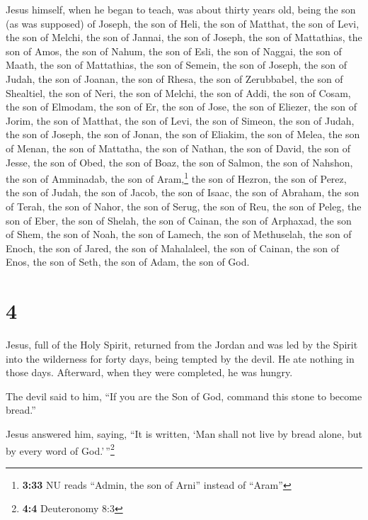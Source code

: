  Jesus himself, when he began to teach, was about thirty
years old, being the son (as was supposed) of Joseph, the son of Heli,
 the son of Matthat, the son of Levi, the son of Melchi,
the son of Jannai, the son of Joseph,  the son of
Mattathias, the son of Amos, the son of Nahum, the son of Esli, the son
of Naggai,  the son of Maath, the son of Mattathias, the
son of Semein, the son of Joseph, the son of Judah,  the
son of Joanan, the son of Rhesa, the son of Zerubbabel, the son of
Shealtiel, the son of Neri,  the son of Melchi, the son
of Addi, the son of Cosam, the son of Elmodam, the son of Er,
 the son of Jose, the son of Eliezer, the son of Jorim,
the son of Matthat, the son of Levi,  the son of Simeon,
the son of Judah, the son of Joseph, the son of Jonan, the son of
Eliakim,  the son of Melea, the son of Menan, the son of
Mattatha, the son of Nathan, the son of David,  the son
of Jesse, the son of Obed, the son of Boaz, the son of Salmon, the son
of Nahshon,  the son of Amminadab, the son of
Aram,\footnote{\textbf{3:33} NU reads ``Admin, the son of Arni'' instead
  of ``Aram''} the son of Hezron, the son of Perez, the son of Judah,
 the son of Jacob, the son of Isaac, the son of Abraham,
the son of Terah, the son of Nahor,  the son of Serug,
the son of Reu, the son of Peleg, the son of Eber, the son of Shelah,
 the son of Cainan, the son of Arphaxad, the son of Shem,
the son of Noah, the son of Lamech,  the son of
Methuselah, the son of Enoch, the son of Jared, the son of Mahalaleel,
the son of Cainan,  the son of Enos, the son of Seth, the
son of Adam, the son of God.

\hypertarget{section-3}{%
\section{4}\label{section-3}}

 Jesus, full of the Holy Spirit, returned from the Jordan
and was led by the Spirit into the wilderness  for forty
days, being tempted by the devil. He ate nothing in those days.
Afterward, when they were completed, he was hungry.

 The devil said to him, ``If you are the Son of God,
command this stone to become bread.''

 Jesus answered him, saying, ``It is written, `Man shall
not live by bread alone, but by every word of God.'\,''\footnote{\textbf{4:4}
  Deuteronomy 8:3}

